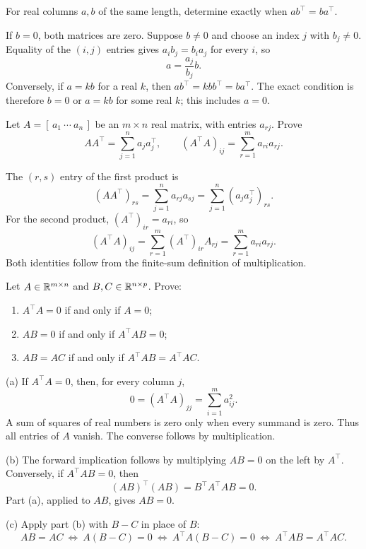 \begin{problem}\label{ex:01:outer-product-symmetry}
For real columns $a,b$ of the same length, determine exactly when
$ab^\top=ba^\top$.
\end{problem}
\begin{solution}
If $b=0$, both matrices are zero. Suppose $b\ne0$ and choose an index
$j$ with $b_j\ne0$. Equality of the $(i,j)$ entries gives
$a_i b_j=b_i a_j$ for every $i$, so
\[
a=\frac{a_j}{b_j}b.
\]
Conversely, if $a=kb$ for a real $k$, then
$ab^\top=kbb^\top=ba^\top$.
The exact condition is therefore $b=0$ or $a=kb$ for some real $k$;
this includes $a=0$.
\end{solution}

\begin{problem}\label{ex:01:outer-product-sums}
Let $A=[\,a_1\ \cdots\ a_n\,]$ be an $m\times n$ real matrix,
with entries $a_{rj}$. Prove
\[
AA^\top=\sum_{j=1}^n a_j a_j^\top,
\qquad
(A^\top A)_{ij}=\sum_{r=1}^m a_{ri}a_{rj}.
\]
\end{problem}
\begin{solution}
The $(r,s)$ entry of the first product is
\[
(AA^\top)_{rs}=\sum_{j=1}^n a_{rj}a_{sj}
=\sum_{j=1}^n(a_j a_j^\top)_{rs}.
\]
For the second product, $(A^\top)_{ir}=a_{ri}$, so
\[
(A^\top A)_{ij}
=\sum_{r=1}^m(A^\top)_{ir}A_{rj}
=\sum_{r=1}^m a_{ri}a_{rj}.
\]
Both identities follow from the finite-sum definition of multiplication.
\end{solution}

\begin{problem}[$\ast$]\label{ex:01:gram-product-cancellation}
Let $A\in\mathbb R^{m\times n}$ and $B,C\in\mathbb R^{n\times p}$. Prove:
\begin{enumerate}
\item $A^\top A=0$ if and only if $A=0$;
\item $AB=0$ if and only if $A^\top AB=0$;
\item $AB=AC$ if and only if $A^\top AB=A^\top AC$.
\end{enumerate}
\end{problem}
\begin{solution}
(a) If $A^\top A=0$, then, for every column $j$,
\[
0=(A^\top A)_{jj}=\sum_{i=1}^m a_{ij}^2.
\]
A sum of squares of real numbers is zero only when every summand is
zero. Thus all entries of $A$ vanish. The converse follows by multiplication.

(b) The forward implication follows by multiplying $AB=0$ on the left
by $A^\top$. Conversely, if $A^\top AB=0$, then
\[
(AB)^\top(AB)=B^\top A^\top AB=0.
\]
Part (a), applied to $AB$, gives $AB=0$.

(c) Apply part (b) with $B-C$ in place of $B$:
\[
AB=AC\ \Longleftrightarrow\ A(B-C)=0
\ \Longleftrightarrow\ A^\top A(B-C)=0
\ \Longleftrightarrow\ A^\top AB=A^\top AC.
\]
\end{solution}

